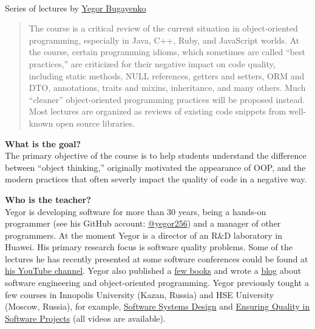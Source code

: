 \documentclass[nobrand,anonymous,nodate,nosecurity]{huawei}
\begin{document}
{\\
Series of lectures by \href{https://www.yegor256.com}{Yegor Bugayenko}


\begin{abstract}
The course is a critical review of the current situation in object-oriented programming,
especially in Java, C++, Ruby, and JavaScript worlds. At the course, certain programming
idioms, which sometimes are called ``best practices,'' are criticized for their
negative impact on code quality, including static methods, NULL references, getters
and setters, ORM and DTO, annotations, traits and mixins, inheritance, and many others.
Much ``cleaner'' object-oriented programming practices will be proposed instead. Most
lectures are organized as reviews of existing code snippets from well-known
open source libraries.
\end{abstract}


\textbf{What is the goal?}\\
The primary objective of the course is to help students understand the
difference between ``object thinking,'' originally motivated the
appearance of OOP, and the modern practices that often
severly impact the quality of code in a negative way.

\textbf{Who is the teacher?}\\
Yegor is developing software for more than 30 years, being a hands-on programmer
(see his GitHub account: \href{https://github.com/yegor256}{@yegor256})
and a manager of other programmers. At the moment Yegor is a director
of an R\&D laboratory in Huawei. His primary research focus is
software quality problems. Some of the lectures he has recently presented
at some software conferences could be found at
\href{https://www.youtube.com/channel/UCr9qCdqXLm2SU0BIs6d_68Q}{his YouTube channel}.
Yegor also published a \href{https://www.yegor256.com/books.html}{few books}
and wrote a \href{https://www.yegor256.com/contents.html}{blog} about software engineering
and object-oriented programming.
Yegor previously tought a few courses in
Innopolis University (Kazan, Russia)
and HSE University (Moscow, Russia),
for example,
\href{https://github.com/yegor256/ssd16}{Software Systems Design}
and
\href{https://github.com/yegor256/eqsp}{Ensuring Quality in Software Projects}
(all videos are available).

}
\end{document}
